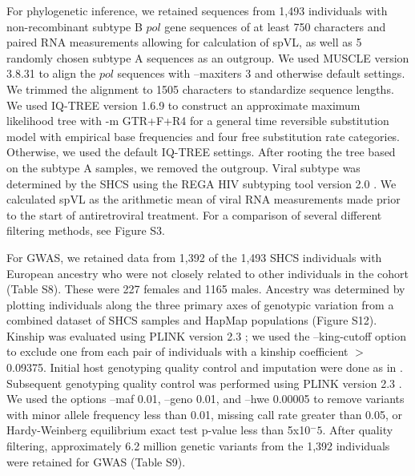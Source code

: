 \documentclass[11pt]{article}
\begin{document}
\begin{linenumbers}
For phylogenetic inference, we retained sequences from 1,493 individuals with non-recombinant subtype B $pol$ gene sequences of at least 750 characters and paired RNA measurements allowing for calculation of spVL, as well as 5 randomly chosen subtype A sequences as an outgroup. We used MUSCLE version 3.8.31 \citep{edgar_muscle:_2004} to align the $pol$ sequences with --maxiters 3 and otherwise default settings. We trimmed the alignment to 1505 characters to standardize sequence lengths. We used IQ-TREE version 1.6.9 \citep{Nguyen2014} to construct an approximate maximum likelihood tree with -m GTR+F+R4 for a general time reversible substitution model with empirical base frequencies and four free substitution rate categories. Otherwise, we used the default IQ-TREE settings. After rooting the tree based on the subtype A samples, we removed the outgroup. Viral subtype was determined by the SHCS using the REGA HIV subtyping tool version 2.0 \citep{DeOliveira2005}. We calculated spVL as the arithmetic mean of viral RNA measurements made prior to the start of antiretroviral treatment. For a comparison of several different filtering methods, see Figure S3. 

For GWAS, we retained data from 1,392 of the 1,493 SHCS individuals with European ancestry who were not closely related to other individuals in the cohort (Table S8). These were 227 females and 1165 males. Ancestry was determined by plotting individuals along the three primary axes of genotypic variation from a combined dataset of SHCS samples and HapMap populations (Figure S12). Kinship was evaluated using PLINK version 2.3 \citep{Chang2015}; we used the --king-cutoff option to exclude one from each pair of individuals with a kinship coefficient $>$ 0.09375. Initial host genotyping quality control and imputation were done as in \cite{Thorball2021GeneticLymphoma}. Subsequent genotyping quality control was performed using PLINK version 2.3 \citep{Chang2015}. We used the options --maf 0.01, --geno 0.01, and --hwe 0.00005 to remove variants with minor allele frequency less than 0.01, missing call rate greater than 0.05, or Hardy-Weinberg equilibrium exact test p-value less than 5x10$^-5$. After quality filtering, approximately 6.2 million genetic variants from the 1,392 individuals were retained for GWAS (Table S9). 


\end{linenumbers}
\end{document}
